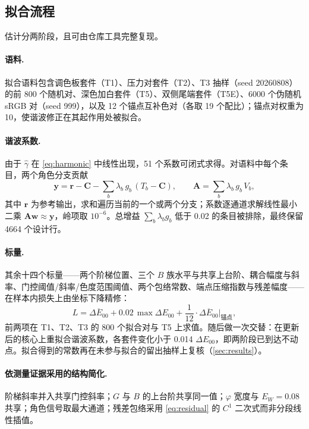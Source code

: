 \subsection{拟合流程}
\label{sec:fitting}

估计分两阶段，且可由仓库工具完整复现。

\paragraph{语料.}
拟合语料包含调色板套件（T1）、压力对套件（T2）、T3 抽样（seed 20260808）的前 800 个随机对、深色加白套件（T5）、双侧尾端套件（T5E）、6000 个伪随机 sRGB 对（seed 999），以及 12 个锚点互补色对（各取 19 个配比）；锚点对权重为 10，使谐波修正在其起作用处被拟合。

\paragraph{谐波系数.}
由于 $\hat{\gamma}$ 在 \cref{eq:harmonic} 中线性出现，51 个系数可闭式求得。对语料中每个条目，两个角色分支贡献
\begin{equation}
\mathbf{y}=
\mathbf{r}-\mathbf{C}-\sum_{b}\lambda_{b}\,g_{b}\,(T_{b}-\mathbf{C}),
\qquad
\mathbf{A}=\sum_{b}\lambda_{b}\,g_{b}\,V_{b},
\label{eq:design}
\end{equation}
其中 $\mathbf{r}$ 为参考输出，求和遍历当前的一个或两个分支；系数逐通道求解线性最小二乘 $\mathbf{A}\mathbf{w}\approx\mathbf{y}$，岭项取 $10^{-6}$。总增益 $\sum_{b}\lambda_{b}g_{b}$ 低于 0.02 的条目被排除，最终保留 4664 个设计行。

\paragraph{标量.}
其余十四个标量——两个阶梯位置、三个 $B$ 族水平与共享上台阶、耦合幅度与斜率、门控阈值/斜率/色度范围阈值、两个包络常数、端点压缩指数与残差幅度——在样本内损失上由坐标下降精修：
\begin{equation}
L=\overline{\Delta E_{00}}+0.02\,\max\Delta E_{00}+\frac{1}{12}\cdot\overline{\Delta E_{00}}\big|_{\text{锚点}},
\label{eq:loss}
\end{equation}
前两项在 T1、T2、T3 的 800 个拟合对与 T5 上求值。随后做一次交替：在更新后的核心上重拟合谐波系数，各套件变化小于 0.014 $\Delta E_{00}$，即两阶段已到达不动点。拟合得到的常数再在未参与拟合的留出抽样上复核（\cref{sec:results}）。

\paragraph{依测量证据采用的结构简化.}
阶梯斜率并入共享门控斜率；$G$ 与 $B$ 的上台阶共享同一值；$\varphi$ 宽度与 $E_{W}=0.08$ 共享；角色信号取最大通道；残差包络采用 \cref{eq:residual} 的 $C^{1}$ 二次式而非分段线性插值。

